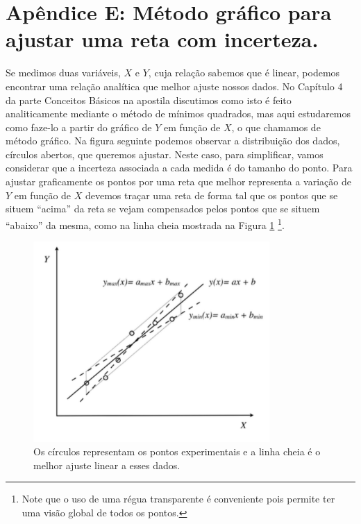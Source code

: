 \documentclass[12pt]{article}
\begin{document}
\clearpage

\section{Apêndice E: Método gráfico para ajustar uma reta com incerteza.}
\label{ApendiceG}
\indent 

Se medimos duas variáveis, $X$ e $Y$, cuja relação sabemos que é linear, podemos encontrar uma relação analítica que melhor ajuste nossos dados. No Capítulo 4 da parte Conceitos Básicos na apostila discutimos como isto é feito analiticamente mediante o método de mínimos quadrados, mas aqui estudaremos como faze-lo a partir do gráfico de $Y$ em função de $X$, o que chamamos de 
método gráfico.
Na figura seguinte podemos observar a distribuição dos dados, círculos abertos, que queremos ajustar. Neste caso, para simplificar, vamos considerar que a incerteza associada a cada medida é do tamanho do ponto. Para ajustar graficamente os pontos por uma reta que melhor representa a 
variação de $Y$ em função de $X$ devemos traçar uma reta de forma tal que os pontos que se situem ``acima'' da reta se vejam compensados pelos pontos que se situem ``abaixo'' da mesma, como na linha cheia mostrada na Figura \ref{fig1AppG} \footnote{Note que o uso de uma régua transparente é conveniente pois permite ter uma visão global de todos os pontos.}.
\begin{figure}[h!]
\includegraphics[width=9cm]{fig1AppG.pdf}
\caption{Os círculos representam os pontos experimentais e a linha cheia é
o melhor ajuste linear a esses dados. }
\label{fig1AppG}
\end{figure}
\end{document}
